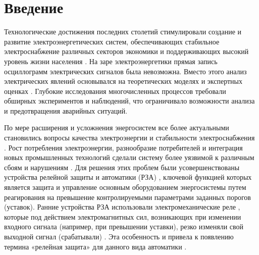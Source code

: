 
\section{Введение}\label{sec:ch3_intro}

Технологические достижения последних столетий стимулировали создание и развитие электроэнергетических систем, обеспечивающих стабильное электроснабжение различных секторов экономики и поддерживающих высокий уровень жизни населения \cite{bavr_bib_051_m_2002,bavr_bib_052_m_2023,bavr_bib_053_z_2021,bavr_bib_054_s_2020,bavr_bib_055_j_2017}. На заре электроэнергетики прямая запись осциллограмм электрических сигналов была невозможна. Вместо этого анализ электрических явлений основывался на теоретических моделях и экспертных оценках \cite{bavr_bib_056_a_2002}. Глубокие исследования многочисленных процессов требовали обширных экспериментов и наблюдений, что ограничивало возможности анализа и предотвращения аварийных ситуаций.\par\vspace{0.2cm}

По мере расширения и усложнения энергосистем все более актуальными становились вопросы
качества электроэнергии и стабильности электроснабжения
\cite{bavr_bib_057_l_2022,bavr_bib_058_ieee_2023}. Рост потребления электроэнергии,
разнообразие потребителей и интеграция новых промышленных технологий сделали систему
более уязвимой к различным сбоям и нарушениям
\cite{bavr_bib_059_s_2015,bavr_bib_060_f_2023}. Для решения этих проблем были
усовершенствованы устройства релейной защиты и автоматики (РЗА)
\cite{bavr_bib_056_a_2002}, ключевой функцией которых является защита и управление
основным оборудованием энергосистемы путем реагирования на превышение контролируемыми
параметрами заданных порогов (уставок). Ранние устройства РЗА использовали
электромеханические реле \cite{bavr_bib_061_disconnector_2020}, которые под действием
электромагнитных сил, возникающих при изменении входного сигнала (например, при
превышении уставки), резко изменяли свой выходной сигнал (срабатывали)
\cite{bavr_bib_062_y_2025}. Эта особенность и привела к появлению термина «релейная
защита» для данного вида автоматики \cite{bavr_bib_063_z_2016}.\par\vspace{0.2cm}

